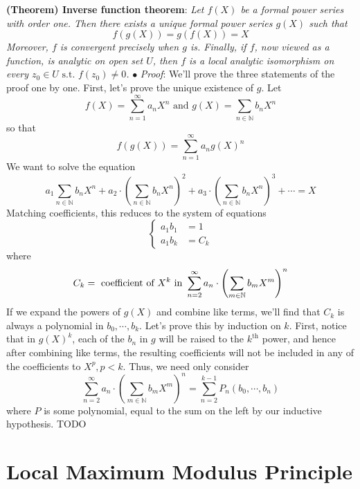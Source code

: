 \documentclass{article}
\newcommand*{\tb}{\textbf}
\newcommand*{\ti}{\textit}
\newcommand*{\n}{\newline}
\newcommand*{\nn}{\newline \newline}
\newcommand*{\Pf}{\indent \ensuremath{\bullet} \textit{Proof}: }
\newcommand*{\N}{\mathbb{N}}
\newcommand*{\st}{\text{ s.t. }}
\begin{document}
\nn
\tb{(Theorem) Inverse function theorem}: \ti{Let $ f(X) $ be a formal power series with order one. Then there exists a unique formal power series $ g(X) $ such that}
    $$ f(g(X)) = g(f(X)) = X $$
\indent \ti{Moreover, $ f $ is convergent precisely when $ g $ is. Finally, if $ f $, now viewed as a function, is analytic on open set $ U $, then $ f $ is a local analytic isomorphism on every $ z_0 \in U \st f(z_0) \neq 0 $.}
\n
\Pf We'll prove the three statements of the proof one by one. First, let's prove the unique existence of $ g $. Let
    $$ f(X) = \sum_{n = 1}^\infty a_n X^n \text{ and } g(X) = \sum_{n \in \N} b_n X^n $$
so that
    $$ f(g(X)) = \sum_{n = 1}^\infty a_n g(X)^n $$
We want to solve the equation
    $$ a_1 \sum_{n \in \N} b_n X^n + a_2 \cdot \left( \sum_{n \in \N} b_n X^n \right)^2 + a_3 \cdot \left( \sum_{n \in \N} b_n X^n \right)^3 + \cdots = X $$
Matching coefficients, this reduces to the system of equations
    $$ \begin{cases}
        a_1 b_1 &= 1 \\
        a_1 b_k &= C_k
    \end{cases} $$
where
    $$ C_k = \text{ coefficient of $ X^k $ in } \sum_{n = 2}^\infty a_n \cdot \left( \sum_{m \in \N} b_m X^m \right)^n $$
If we expand the powers of $ g(X) $ and combine like terms, we'll find that $ C_k $ is always a polynomial in $ b_0, \cdots, b_k $. Let's prove this by induction on $ k $. First, notice that in $ g(X)^k $, each of the $ b_n $ in $ g $ will be raised to the $ k^{\text{th}} $ power, and hence after combining like terms, the resulting coefficients will not be included in any of the coefficients to $ X^p, p < k $. Thus, we need only consider
    $$ \sum_{n = 2}^\infty a_n \cdot \left( \sum_{m \in \N} b_m X^m \right)^n = \sum_{n = 2}^{k - 1} P_n(b_0, \cdots, b_n) $$
where $ P $ is some polynomial, equal to the sum on the left by our inductive hypothesis. TODO


\section{Local Maximum Modulus Principle}
\end{document}
